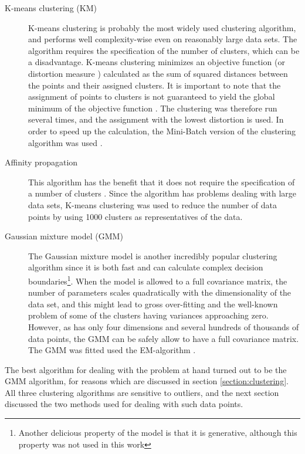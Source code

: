 \begin{description}
\item[K-means clustering (KM)] K-means clustering is probably the most widely used clustering algorithm, and performs well complexity-wise even on reasonably large data sets. The algorithm requires the specification of the number of clusters, which can be a disadvantage. K-means clustering minimizes an objective function (or distortion measure \cite{bishop2006pattern}) calculated as the sum of squared distances between the points and their assigned clusters. It is important to note that the assignment of points to clusters is not guaranteed to yield the global minimum of the objective function \cite{izenman2008modern}. The clustering was therefore run several times, and the assignment with the lowest distortion is used. In order to speed up the calculation, the Mini-Batch version of the clustering algorithm was used \cite{sculley2010web}.
\item[Affinity propagation] This algorithm has the benefit that it does not require the specification of a number of clusters \cite{frey2007clustering}. Since the algorithm has problems dealing with large data sets, K-means clustering was used to reduce the number of data points by using 1000 clusters as representatives of the data.
\item[Gaussian mixture model (GMM)] The Gaussian mixture model is another incredibly popular clustering algorithm since it is both fast and can calculate complex decision boundaries\footnote{Another delicious property of the model is that it is generative, although this property was not used in this work}. When the model is allowed to a full covariance matrix, the number of parameters scales quadratically with the dimensionality of the data set, and this might lead to gross over-fitting and the well-known problem of some of the clusters having variances approaching zero. However, as \datamatrixfit{} has only four dimensions and several hundreds of thousands of data points, the GMM can be safely allow to have a full covariance matrix. The GMM was fitted used the EM-algorithm \cite{bilmes1998gentle, bishop2006pattern}.
\end{description}

The best algorithm for dealing with the problem at hand turned out to be the GMM algorithm, for reasons which are discussed in section \ref{section:clustering}. All three clustering algorithms are sensitive to outliers, and the next section discussed the two methods used for dealing with such data points.




